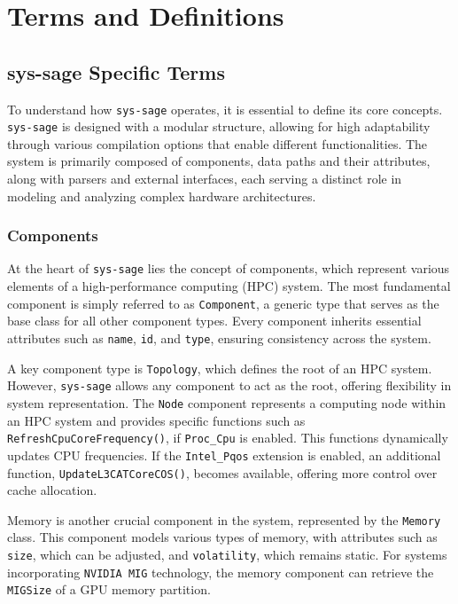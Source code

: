 \chapter{Terms and Definitions}\label{chapter:terms_and_definition}

\section{sys-sage Specific Terms}

To understand how \texttt{sys-sage} operates, it is essential to define its core concepts. \texttt{sys-sage} is designed with a modular structure, allowing for high adaptability through various compilation options that enable different functionalities. The system is primarily composed of components, data paths and their attributes, along with parsers and external interfaces, each serving a distinct role in modeling and analyzing complex hardware architectures.

\subsection{Components }

At the heart of \texttt{sys-sage} lies the concept of components, which represent various elements of a high-performance computing (\ac{HPC}) system. The most fundamental component is simply referred to as \texttt{Component}, a generic type that serves as the base class for all other component types. Every component inherits essential attributes such as \texttt{name}, \texttt{id}, and \texttt{type}, ensuring consistency across the system. \cite[see Component]{sys-sage-docu}

A key component type is \texttt{Topology}, which defines the root of an \ac{HPC} system. However, \texttt{sys-sage} allows any component to act as the root, offering flexibility in system representation. The \texttt{Node} component represents a computing node within an \ac{HPC} system and provides specific functions such as \texttt{RefreshCpuCoreFrequency()}, if \texttt{Proc\_Cpu} is enabled. This functions dynamically updates CPU frequencies. If the \texttt{Intel\_Pqos} extension is enabled, an additional function, \texttt{UpdateL3CATCoreCOS()}, becomes available, offering more control over cache allocation. \cite[see Topology, Node]{sys-sage-docu}

Memory is another crucial component in the system, represented by the \texttt{Memory} class. This component models various types of memory, with attributes such as \texttt{size}, which can be adjusted, and \texttt{volatility}, which remains static. For systems incorporating \texttt{NVIDIA MIG} technology, the memory component can retrieve the \texttt{MIGSize} of a \ac{GPU} memory partition. \cite[see Memory]{sys-sage-docu}

